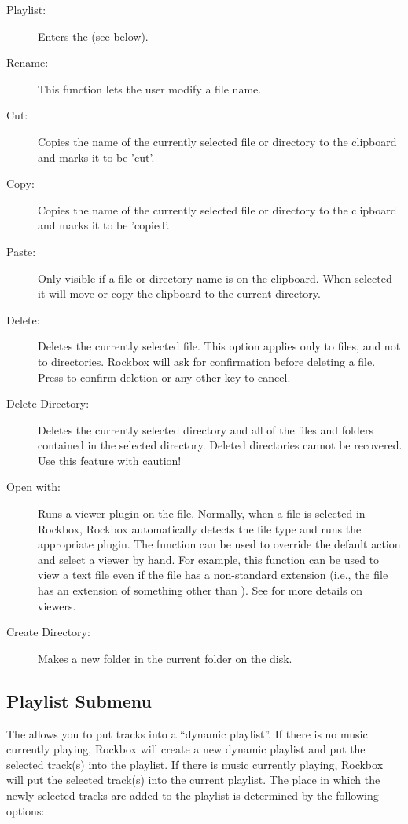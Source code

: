 \begin{description}
\item [Playlist:]
  Enters the  (see below).
\item [Rename:]
  This function lets the user modify a file name.
\item [Cut:]
  Copies the name of the currently selected file or directory to the clipboard
  and marks it to be 'cut'.
\item [Copy:]
  Copies the name of the currently selected file or directory to the clipboard
  and marks it to be 'copied'.
\item [Paste:]
  Only visible if a file or directory name is on the clipboard. When selected
  it will move or copy the clipboard to the current directory.
\item [Delete:]
  Deletes the currently selected file.  This option applies only to files, and
  not to directories.  Rockbox will ask for confirmation before deleting a file.
  Press
      {\ButtonSelect}
 to confirm deletion or any other key to cancel.
\item [Delete Directory:]
  Deletes the currently selected directory and all of the files and folders
  contained in the selected directory.  Deleted directories cannot be recovered.
  Use this feature with caution!
\item [Open with:] 
  Runs a viewer plugin on the file. Normally, when a file is selected in Rockbox,
  Rockbox automatically detects the file type and runs the appropriate plugin.
  The  function can be used to override the default action and
  select a viewer by hand.  For example, this function can be used to view a text file
  even if the file has a non-standard extension (i.e., the file has an extension
  of something other than ).  See 
  for more details on viewers.
\item [Create Directory:]
  Makes a new folder in the current folder on the disk.
\end{description}

\subsection{\label{ref:Playlistsubmenu}Playlist Submenu}
The  allows you to put tracks into a ``dynamic playlist''.
If there is no music currently playing, Rockbox will create a new dynamic playlist
and put the selected track(s) into the playlist.  If there is music currently playing,
Rockbox will put the selected track(s) into the current playlist.  The place in which
the newly selected tracks are added to the playlist is determined by the following
options:

